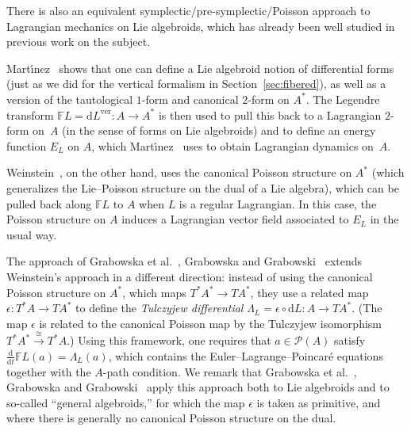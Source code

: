 \documentclass[pdftex]{sigma}
\numberwithin{equation}{section}
\begin{document}
\begin{Remark} \label{rmk:poisson} There is also an equivalent symplectic/pre-symplectic/Poisson approach to Lagrangian mechanics on Lie algebroids, which has already been well studied in previous work on the subject.

Mart\'{\i}nez~\cite{Martinez2001} shows that one can def\/ine a Lie algebroid notion of dif\/ferential forms (just as we did for the vertical formalism in Section~\ref{sec:fibered}), as well as a version of the tautological $1$-form and canonical $2$-form on $ A ^\ast $. The Legendre transform $ \mathbb{F} L = \mathrm{d} L ^\text{ver} \colon A \rightarrow A ^\ast $ is then used to pull this back to a Lagrangian $2$-form on~$A$ (in the sense of forms on Lie algebroids) and to def\/ine an energy function $ E _L $ on $A$, which Mart\'{\i}nez~\cite{Martinez2001} uses to obtain Lagrangian dynamics on~$A$.

Weinstein~\cite{Weinstein1996}, on the other hand, uses the canonical Poisson structure on $ A ^\ast $ (which generalizes the Lie--Poisson structure on the dual of a Lie algebra), which can be pulled back along $ \mathbb{F} L $ to $ A $ when $L$ is a regular Lagrangian. In this case, the Poisson structure on $A$ induces a Lagrangian vector f\/ield associated to $ E _L $ in the usual way.

The approach of Grabowska et al.~\cite{GrUrGr2006}, Grabowska and Grabowski~\cite{GrGr2008} extends Weinstein's approach in a dif\/ferent direction: instead of using the canonical Poisson structure on $ A ^\ast $, which maps $ T ^\ast A ^\ast \rightarrow T A ^\ast $, they use a related map $ \epsilon \colon T ^\ast A \rightarrow T A ^\ast $ to def\/ine the \emph{Tulczyjew differential} $ \Lambda _L = \epsilon \circ \mathrm{d} L \colon A \rightarrow T A ^\ast $. (The map $\epsilon$ is related to the canonical Poisson map by the Tulczyjew isomorphism $ T ^\ast A ^\ast \xrightarrow{\cong} T ^\ast A $.) Using this framework, one requires that $ a \in \mathcal{P} (A) $ satisfy $ \frac{\mathrm{d}}{\mathrm{d}t} \mathbb{F} L (a) = \Lambda _L (a) $, which contains the Euler--Lagrange--Poincar\'e equations together with the $A$-path condition. We remark that Grabowska et al.~\cite{GrUrGr2006}, Grabowska and Grabowski~\cite{GrGr2008} apply this approach both to Lie algebroids and to so-called ``general algebroids,'' for which the map $\epsilon$ is taken as primitive, and where there is generally no canonical Poisson structure on the dual.
\end{Remark}
\end{document}

